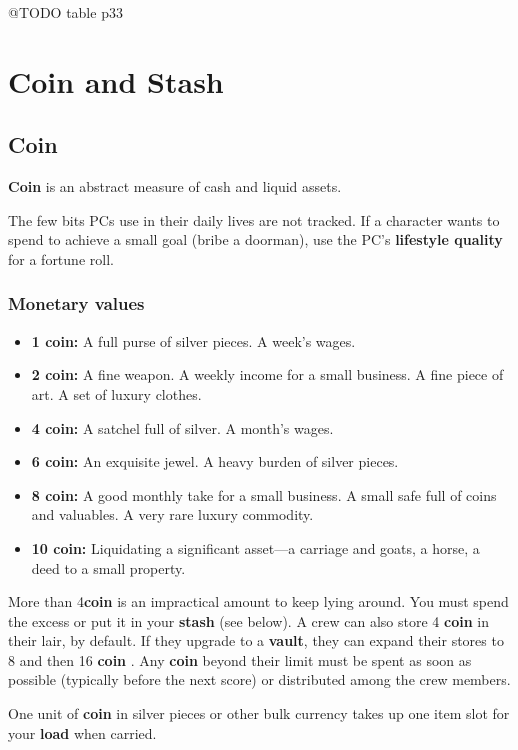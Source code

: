 \documentclass[11pt,fleqn,a5paper]{book}
\newcommand{\gameterm}[1]{\textbf{#1}}
\begin{document}
@TODO table p33

\chapter{Coin and Stash}

\section{Coin}

\gameterm{Coin}  is an abstract measure of cash and liquid assets.

The few bits PCs use in their daily lives are not tracked. If a character wants to spend to achieve a small goal (bribe a doorman), use the PC’s \textbf{lifestyle quality} for a fortune roll.

\subsection{Monetary values}

\begin{itemize}
	\item \gameterm{1 coin: } A full purse of silver pieces. A week’s wages.
	\item \gameterm{2 coin:}  A fine weapon. A weekly income for a small business. A fine piece of art. A set of luxury clothes.
	\item \gameterm{4 coin:}  A satchel full of silver. A month’s wages.
	\item \gameterm{6 coin:}  An exquisite jewel. A heavy burden of silver pieces.
	\item \gameterm{8 coin:}  A good monthly take for a small business. A small safe full of coins and valuables. A very rare luxury commodity.
	\item \gameterm{10 coin:}  Liquidating a significant asset---a carriage and goats, a horse, a deed to a small property.
\end{itemize}

More than 4\gameterm{coin}  is an impractical amount to keep lying around. You must spend the excess or put it in your \textbf{stash} (see below). A crew can also store 4 \gameterm{coin}  in their lair, by default. If they upgrade to a \textbf{vault}, they can expand their stores to 8 and then 16 \gameterm{coin} . Any \gameterm{coin}  beyond their limit must be spent as soon as possible (typically before the next score) or distributed among the crew members.

One unit of \gameterm{coin}  in silver pieces or other bulk currency takes up one item slot for your \textbf{load} when carried.
\end{document}
